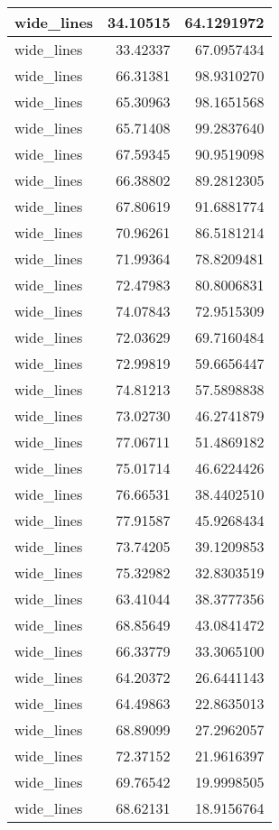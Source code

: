 \documentclass[
]{book}
\theoremstyle{definition}
\theoremstyle{definition}
\theoremstyle{definition}
\theoremstyle{definition}
\theoremstyle{remark}
\begin{document}
\begin{tabular}{l|r|r}
\hline
wide\_lines & 34.10515 & 64.1291972\\
\hline
wide\_lines & 33.42337 & 67.0957434\\
\hline
wide\_lines & 66.31381 & 98.9310270\\
\hline
wide\_lines & 65.30963 & 98.1651568\\
\hline
wide\_lines & 65.71408 & 99.2837640\\
\hline
wide\_lines & 67.59345 & 90.9519098\\
\hline
wide\_lines & 66.38802 & 89.2812305\\
\hline
wide\_lines & 67.80619 & 91.6881774\\
\hline
wide\_lines & 70.96261 & 86.5181214\\
\hline
wide\_lines & 71.99364 & 78.8209481\\
\hline
wide\_lines & 72.47983 & 80.8006831\\
\hline
wide\_lines & 74.07843 & 72.9515309\\
\hline
wide\_lines & 72.03629 & 69.7160484\\
\hline
wide\_lines & 72.99819 & 59.6656447\\
\hline
wide\_lines & 74.81213 & 57.5898838\\
\hline
wide\_lines & 73.02730 & 46.2741879\\
\hline
wide\_lines & 77.06711 & 51.4869182\\
\hline
wide\_lines & 75.01714 & 46.6224426\\
\hline
wide\_lines & 76.66531 & 38.4402510\\
\hline
wide\_lines & 77.91587 & 45.9268434\\
\hline
wide\_lines & 73.74205 & 39.1209853\\
\hline
wide\_lines & 75.32982 & 32.8303519\\
\hline
wide\_lines & 63.41044 & 38.3777356\\
\hline
wide\_lines & 68.85649 & 43.0841472\\
\hline
wide\_lines & 66.33779 & 33.3065100\\
\hline
wide\_lines & 64.20372 & 26.6441143\\
\hline
wide\_lines & 64.49863 & 22.8635013\\
\hline
wide\_lines & 68.89099 & 27.2962057\\
\hline
wide\_lines & 72.37152 & 21.9616397\\
\hline
wide\_lines & 69.76542 & 19.9998505\\
\hline
wide\_lines & 68.62131 & 18.9156764\\

\end{tabular}
\end{document}
